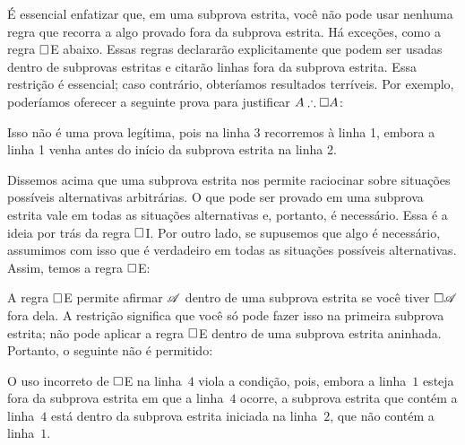 É essencial enfatizar que, em uma subprova estrita, você não pode usar nenhuma regra que recorra a algo provado fora da subprova estrita. Há exceções, como a regra $\Box$E abaixo. Essas regras declararão explicitamente que podem ser usadas dentro de subprovas estritas e citarão linhas fora da subprova estrita. Essa restrição é essencial; caso contrário, obteríamos resultados terríveis. Por exemplo, poderíamos oferecer a seguinte prova para justificar $A\therefore \ebox A$:
\begin{fitchproof}
		\PR
		\open
		\AS
		\close
\end{fitchproof}
Isso não é uma prova legítima, pois na linha 3 recorremos à linha 1, embora a linha 1 venha antes do início da subprova estrita na linha 2.

Dissemos acima que uma subprova estrita nos permite raciocinar sobre situações possíveis alternativas arbitrárias. O que pode ser provado em uma subprova estrita vale em todas as situações alternativas e, portanto, é necessário. Essa é a ideia por trás da regra $\Box$I. Por outro lado, se supusemos que algo é necessário, assumimos com isso que é verdadeiro em todas as situações possíveis alternativas. Assim, temos a regra $\Box$E:

A regra $\Box$E permite afirmar $\mathscr{A}$ dentro de uma subprova estrita se você tiver $\Box \mathscr{A}$ fora dela. A restrição significa que você só pode fazer isso na primeira subprova estrita; não pode aplicar a regra $\Box$E dentro de uma subprova estrita aninhada. Portanto, o seguinte não é permitido:
\begin{fitchproof}
	\open
	\AS
	\open
	\AS
\close\close
\end{fitchproof}
O uso incorreto de $\Box$E na linha~$4$ viola a condição, pois, embora a linha~$1$ esteja fora da subprova estrita em que a linha~$4$ ocorre, a subprova estrita que contém a linha~$4$ está dentro da subprova estrita iniciada na linha~$2$, que não contém a linha~$1$.

